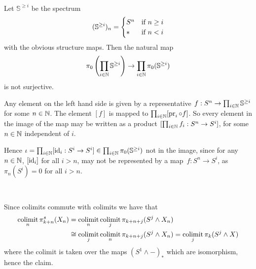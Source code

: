 
\def \L{\mathbb{L}}
\def \S{\mathbb{S}}
\def \O{\mathcal{O}}

\def \SMod{\S\text{-}\hspace{-.15em}\Mod}

\def \smsh {\wedge}

\renewcommand{\Xi}{{\mbox{\larger[2]$\pmb\xi$}}}


\mmaketitle

\begin{exercise}[1]\ 

Let $\S^{\ge i}$ be the spectrum 
\[ (\S^{\ge i})_n = \pwf{S^n &\tif n \ge i \\ * &\tif n < i} \]
with the obvious structure maps. 
Then the natural map 
\[ \pi_0\left( \prod_{i\in\N} \S^{\ge i} \right) \to 
    \prod_{i\in\N} \pi_0(\S^{\ge i}) \]
is not surjective.

Any element on the left hand side is given by a representative 
$f : S^n \to \prod_{i\in\N} \S^{\ge i}$ for some $n \in \mathbb{N}$.
The element $[f]$ is mapped to $\prod_{i\in\mathbb{N}} [\operatorname{pr}_i \circ f]$. So every
element in the image of the map may be written as a product $[\prod_{i\in\mathbb{N}}
f_i : S^n \to S^i]$, for some $n\in \mathbb{N}$ independent of $i$.

Hence $\iota = \prod_{i\in\N} [\id_i : S^i \to S^i] \in \prod_{i\in\N}
\pi_0(\S^{\ge i})$ not in the image, since for any $n\in \mathbb{N}$, $[\operatorname{id}_i]$ for
all $i > n$, may not be represented by a map $f : S^n \to S^i$, as $\pi_n(S^i)
= 0$ for all $i > n$.
\end{exercise}

\begin{exercise}[2]\ 

Since colimits commute with colimits we have that
\begin{align*}
    \colimit_n\pi_{k+n}^s(X_n)&=\colimit_n\colimit_j\pi_{k+n+j}(S^j\smsh X_n)\\
    &\cong\colimit_j\colimit_n\pi_{k+n+j}(S^j\smsh X_n)=\colimit_j\pi_k(S^j\smsh X)
\end{align*}
where the colimit is taken over the maps $(S^1\smsh-)_*$ which are isomorphism, hence the claim.
\end{exercise}

